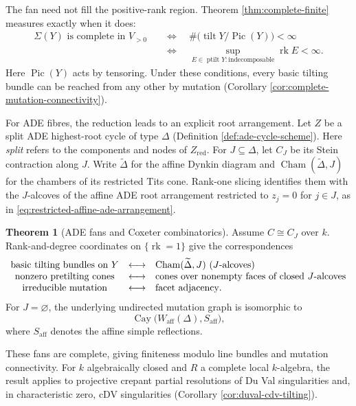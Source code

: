 \documentclass[a4paper,reqno]{amsart}
\DeclareMathOperator{\Pic}{Pic}
\DeclareMathOperator{\tilt}{tilt}
\DeclareMathOperator{\ptilt}{ptilt}
\DeclareMathOperator{\rk}{rk}
\theoremstyle{definition}
\newtheorem{IntroThm}{Theorem}
\begin{document}
The fan need not fill the positive-rank region. Theorem \ref{thm:complete-finite} measures exactly when it does:
\[
\begin{aligned}
\Sigma(Y)\text{ is complete in }V_{>0}
&\quad\Longleftrightarrow\quad \#\bigl(\tilt Y/\Pic(Y)\bigr)<\infty\\
&\quad\Longleftrightarrow\quad
\sup_{E\in\ptilt Y\colon\text{indecomposable}}\rk E<\infty.
\end{aligned}
\]
Here $\Pic(Y)$ acts by tensoring. Under these conditions, every basic tilting bundle can be reached from any other by mutation (Corollary \ref{cor:complete-mutation-connectivity}).

For ADE fibres, the reduction leads to an explicit root arrangement. Let $Z$ be a split ADE highest-root cycle of type $\Delta$ (Definition \ref{def:ade-cycle-scheme}). Here \emph{split} refers to the components and nodes of $Z_{\mathrm{red}}$. For $J\subseteq\Delta$, let $C_J$ be its Stein contraction along $J$. Write $\widetilde\Delta$ for the affine Dynkin diagram and $\operatorname{Cham}(\widetilde\Delta,J)$ for the chambers of its restricted Tits cone. Rank-one slicing identifies them with the $J$-alcoves of the affine ADE root arrangement restricted to $z_j=0$ for $j\in J$, as in \eqref{eq:restricted-affine-ade-arrangement}.

\begin{IntroThm}[ADE fans and Coxeter combinatorics]\label{intro:ade-alcoves}
Assume $C\cong C_J$ over $k$. Rank-and-degree coordinates on $\{\rk=1\}$ give the correspondences
\[
\begin{array}{c@{\quad\longleftrightarrow\quad}l}
\text{basic tilting bundles on }Y & \operatorname{Cham}(\widetilde\Delta,J)\text{ ($J$-alcoves)}\\
\text{nonzero pretilting cones} & \text{cones over nonempty faces of closed $J$-alcoves}\\
\text{irreducible mutation} & \text{facet adjacency}.
\end{array}
\]
For $J=\varnothing$, the underlying undirected mutation graph is isomorphic to
\[
\operatorname{Cay}\bigl(W_{\mathrm{aff}}(\Delta),S_{\mathrm{aff}}\bigr),
\]
where $S_{\mathrm{aff}}$ denotes the affine simple reflections.
\end{IntroThm}

These fans are complete, giving finiteness modulo line bundles and mutation connectivity. For $k$ algebraically closed and $R$ a complete local $k$-algebra, the result applies to projective crepant partial resolutions of Du Val singularities and, in characteristic zero, cDV singularities (Corollary \ref{cor:duval-cdv-tilting}).
\end{document}
